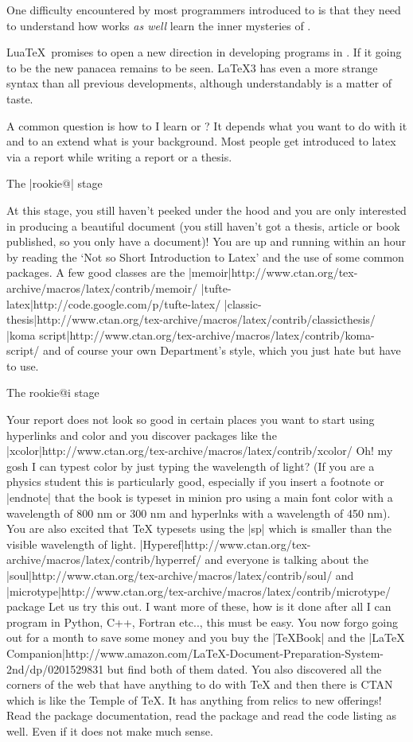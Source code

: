 One difficulty encountered by most programmers introduced to \alltex is that they need to understand how \tex works \textit{as well} learn the inner mysteries of \latex. 

Lua\TeX\ promises to open a new direction in developing programs in \alltex. If it going to be the new panacea remains to be seen. \LaTeX3 has even a more strange syntax than all previous developments, although understandably is a matter of taste.

A common question is how to I learn \tex or \latex? It depends what you want to do with it and to an extend what is your background. Most people get introduced to latex via a report while writing a report or a thesis. 


The |rookie@| stage

At this stage, you still haven't peeked under the hood and you are only interested in producing a beautiful document (you still haven't got a thesis, article or book published, so you only have a document)! You are up and running within an hour by reading the `Not so Short Introduction to Latex' and the use of some common packages. A few good classes are the |memoir|http://www.ctan.org/tex-archive/macros/latex/contrib/memoir/ |tufte-latex|http://code.google.com/p/tufte-latex/ |classic-thesis|http://www.ctan.org/tex-archive/macros/latex/contrib/classicthesis/ |koma script|http://www.ctan.org/tex-archive/macros/latex/contrib/koma-script/ and of course your own Department's style, which you just hate but have to use. 


The rookie@i stage

Your report does not look so good in certain places you want to start using hyperlinks and color and you discover packages like the  |xcolor|http://www.ctan.org/tex-archive/macros/latex/contrib/xcolor/ Oh! my gosh I can typest color by just typing the wavelength of light?
(If you are a physics student this is particularly good, especially if you insert a footnote or |endnote| that the book is typeset in minion pro using a main font color with a wavelength of 800 nm or 300 nm and hyperlnks with a wavelength of 450 nm). You are also excited that TeX typesets using the |sp| which is smaller than the visible wavelength of light.
|Hyperef|http://www.ctan.org/tex-archive/macros/latex/contrib/hyperref/ and everyone is talking about the |soul|http://www.ctan.org/tex-archive/macros/latex/contrib/soul/ and |microtype|http://www.ctan.org/tex-archive/macros/latex/contrib/microtype/ package Let us try this out. I want more of these, how is it done after all I can program in Python, C++, Fortran etc.., this must be easy. You now forgo going out for a month to save some money and you buy the |TeXBook| and the |LaTeX Companion|http://www.amazon.com/LaTeX-Document-Preparation-System-2nd/dp/0201529831 but find both of them dated. You also discovered all the corners of the web that have anything to do with TeX and then there is CTAN which is like the Temple of TeX. It has anything from relics to new offerings! Read the package documentation, read the package and read the code listing as well. Even if it does not make much sense.

